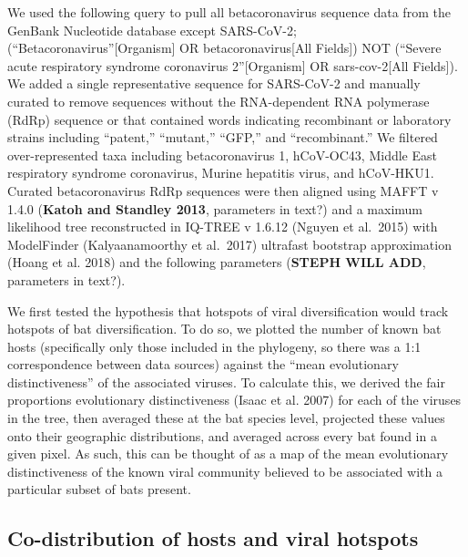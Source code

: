 \documentclass[11pt]{article}
\begin{document}
We used the following query to pull all betacoronavirus sequence data
from the GenBank Nucleotide database except SARS-CoV-2;
(``Betacoronavirus''{[}Organism{]} OR betacoronavirus{[}All Fields{]})
NOT (``Severe acute respiratory syndrome coronavirus 2''{[}Organism{]}
OR sars-cov-2{[}All Fields{]}). We added a single representative
sequence for SARS-CoV-2 and manually curated to remove sequences without
the RNA-dependent RNA polymerase (RdRp) sequence or that contained words
indicating recombinant or laboratory strains including ``patent,''
``mutant,'' ``GFP,'' and ``recombinant.'' We filtered over-represented
taxa including betacoronavirus 1, hCoV-OC43, Middle East respiratory
syndrome coronavirus, Murine hepatitis virus, and hCoV-HKU1. Curated
betacoronavirus RdRp sequences were then aligned using MAFFT v 1.4.0
(\textbf{Katoh and Standley 2013}, parameters in text?) and a maximum
likelihood tree reconstructed in IQ-TREE v 1.6.12 (Nguyen et al.~2015)
with ModelFinder (Kalyaanamoorthy et al.~2017) ultrafast bootstrap
approximation (Hoang et al. 2018) and the following parameters
(\textbf{STEPH WILL ADD}, parameters in text?).

We first tested the hypothesis that hotspots of viral diversification
would track hotspots of bat diversification. To do so, we plotted the
number of known bat hosts (specifically only those included in the
phylogeny, so there was a 1:1 correspondence between data sources)
against the ``mean evolutionary distinctiveness'' of the associated
viruses. To calculate this, we derived the fair proportions evolutionary
distinctiveness (Isaac et al. 2007) for each of the viruses in the tree,
then averaged these at the bat species level, projected these values
onto their geographic distributions, and averaged across every bat found
in a given pixel. As such, this can be thought of as a map of the mean
evolutionary distinctiveness of the known viral community believed to be
associated with a particular subset of bats present.

\hypertarget{co-distribution-of-hosts-and-viral-hotspots}{%
\subsection{Co-distribution of hosts and viral
hotspots}\label{co-distribution-of-hosts-and-viral-hotspots}}
\end{document}
